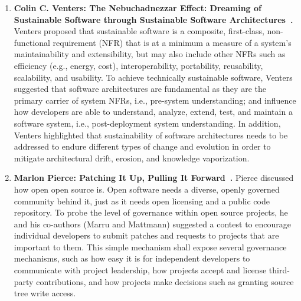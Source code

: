 \documentclass[11pt, oneside]{amsart}
\begin{document}

\begin{enumerate}
\item \textbf{Colin C. Venters: The Nebuchadnezzar Effect: Dreaming of Sustainable
Software through Sustainable Software Architectures~\cite{Venters_poster}.}
Venters proposed that sustainable software is a composite, first-class,
non-functional requirement (NFR) that is at a minimum a measure of a system's
maintainability and extensibility, but may also include other NFRs such as
efficiency (e.g., energy, cost), interoperability, portability, reusability,
scalability, and usability. To achieve technically sustainable software, Venters
suggested that software architectures are fundamental as they are the primary
carrier of system NFRs, i.e., pre-system understanding; and influence how
developers are able to understand, analyze, extend, test, and maintain a
software system, i.e., post-deployment system understanding. In addition,
Venters highlighted that sustainability of software architectures needs to be
addressed to endure different types of change and evolution in order to mitigate
architectural drift, erosion, and knowledge vaporization.



\item \textbf{Marlon Pierce: Patching It Up, Pulling It
Forward~\cite{Pierce_poster}.} Pierce discussed how open open source is. Open
software needs a diverse, openly governed community behind it, just as it needs
open licensing and a public code repository. To probe the level of governance
within open source projects, he and his co-authors (Marru and Mattmann)
suggested a contest to encourage individual developers to submit
patches and requests to projects that are important to them. This simple
mechanism shall expose several governance mechanisms, such as how easy it is for
independent developers to communicate with project leadership, how projects
accept and license third-party contributions, and how projects make
decisions such as granting source tree write access.


\end{enumerate}
\end{document}
